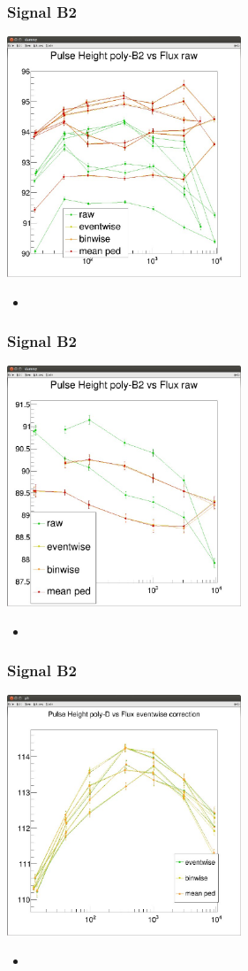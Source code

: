 \documentclass[9pt]{beamer}
\begin{document}
\begin{frame}
	\frametitle{Signal B2}
	\begin{center}
		\includegraphics[width=7cm]{Pics/B2full}
	\end{center}
	\begin{itemize}
		\item 
	\end{itemize}
\end{frame}
\begin{frame}
	\frametitle{Signal B2}
	\begin{center}
		\includegraphics[width=7cm]{Pics/b2updown}
	\end{center}
	\begin{itemize}
		\item 
	\end{itemize}
\end{frame}
\begin{frame}
	\frametitle{Signal B2}
	\begin{center}
		\includegraphics[width=7cm]{Pics/b2}
	\end{center}
	\begin{itemize}
		\item 
	\end{itemize}
\end{frame}
\end{document}
